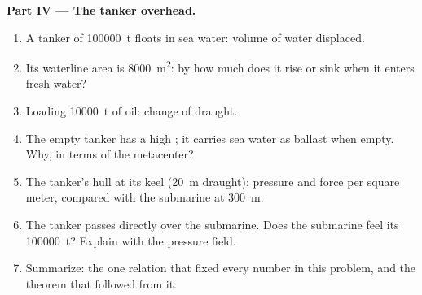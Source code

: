\begin{problem}
\medskip
\noindent\textbf{Part IV --- The tanker overhead.}
\begin{enumerate}[resume]
  \item A tanker of \qty{100000}{t} floats in sea water: volume of water
        displaced.
  \item Its waterline area is \qty{8000}{m^2}: by how much does it rise or
        sink when it enters fresh water?
  \item Loading \qty{10000}{t} of oil: change of draught.
  \item The empty tanker has a high ; it carries sea water
        as ballast when empty. Why, in terms of the metacenter?
  \item The tanker's hull at its keel (\qty{20}{m} draught): pressure and
        force per square meter, compared with the submarine at
        \qty{300}{m}.
  \item The tanker passes directly over the submarine. Does the
        submarine feel its \qty{100000}{t}? Explain with the pressure
        field.
  \item Summarize: the one relation that fixed every number in this
        problem, and the theorem that followed from it.
\end{enumerate}
\end{problem}
